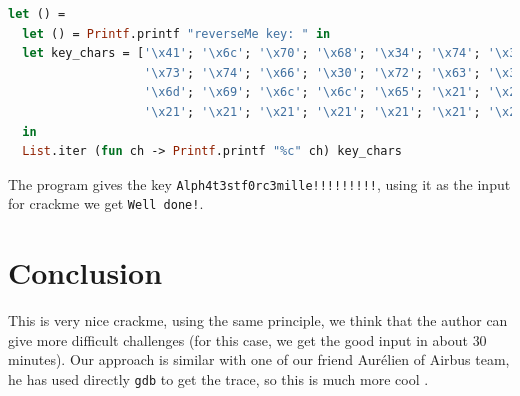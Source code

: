 \documentclass{easychair}
\begin{document}
\begin{lstlisting}[frame=single, caption={Calculate good input}, captionpos=b, boxpos=b, language=Caml, label=lst:keygen]
let () =
  let () = Printf.printf "reverseMe key: " in
  let key_chars = ['\x41'; '\x6c'; '\x70'; '\x68'; '\x34'; '\x74'; '\x33';
                   '\x73'; '\x74'; '\x66'; '\x30'; '\x72'; '\x63'; '\x33';
                   '\x6d'; '\x69'; '\x6c'; '\x6c'; '\x65'; '\x21'; '\x21';
                   '\x21'; '\x21'; '\x21'; '\x21'; '\x21'; '\x21'; '\x21']
  in
  List.iter (fun ch -> Printf.printf "%c" ch) key_chars
\end{lstlisting}

The program gives the key \texttt{Alph4t3stf0rc3mille!!!!!!!!!}, using it as the input for crackme we get \texttt{Well done!}.


\section{Conclusion}
This is very nice crackme, using the same principle, we think that the author can give more difficult challenges (for this case, we get the good input in about $30$ minutes). Our approach is similar with one of our friend Aurélien of Airbus team, he has used directly \texttt{gdb} to get the trace, so this is much more cool \smiley{}. 

\printbibliography
\end{document}
